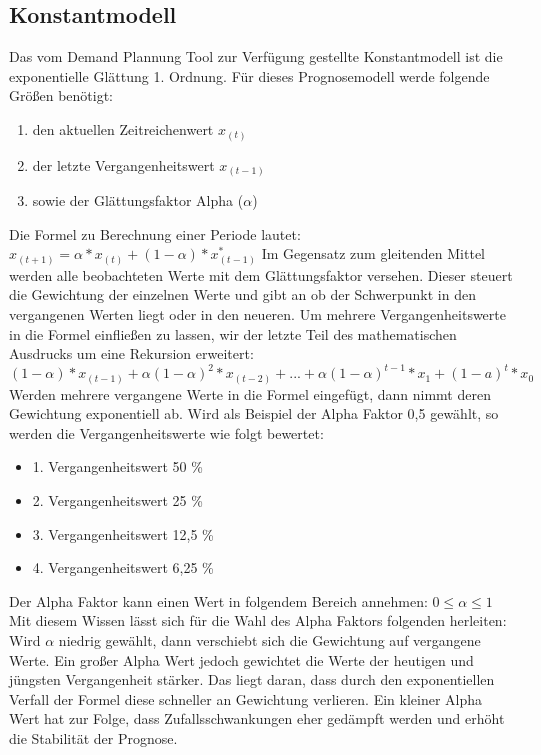 \subsection{Konstantmodell}
Das vom Demand Plannung Tool zur Verfügung gestellte Konstantmodell ist die exponentielle Glättung 1. Ordnung. Für dieses Prognosemodell werde folgende Größen benötigt:
\begin{enumerate}
	\item den aktuellen Zeitreichenwert \(x_{(t)}\)
	\item der letzte Vergangenheitswert \(x_{(t-1)}\)
	\item sowie der Glättungsfaktor Alpha (\(\alpha\))
\end{enumerate}
Die Formel zu Berechnung einer Periode lautet:
\newline
$x_{(t+1)} = \alpha * x_{(t)} + (1 - \alpha) * x^*_{(t-1)} $
\newline
Im Gegensatz zum gleitenden Mittel werden alle beobachteten Werte mit dem Glättungsfaktor versehen. Dieser steuert die Gewichtung der einzelnen Werte und gibt an ob der Schwerpunkt in den vergangenen Werten liegt oder in den neueren.
Um mehrere Vergangenheitswerte in die Formel einfließen zu lassen, wir der letzte Teil des mathematischen Ausdrucks um eine Rekursion erweitert:
\newline
$ (1 - \alpha) * x_{(t-1)} + \alpha(1 - \alpha)^{2} * x_{(t-2)} + ... + \alpha(1 - \alpha)^{t-1} * x_{1} + (1-a)^t * x_0 $
\newline
Werden mehrere vergangene Werte in die Formel eingefügt, dann nimmt deren Gewichtung exponentiell ab. Wird als Beispiel der Alpha Faktor 0,5 gewählt, so werden die Vergangenheitswerte wie folgt bewertet:
\begin{itemize}
	\item 1. Vergangenheitswert 50 \%
	\item 2. Vergangenheitswert 25 \%
	\item 3. Vergangenheitswert 12,5 \%
	\item 4. Vergangenheitswert 6,25 \%
\end{itemize}
Der Alpha Faktor kann einen Wert in folgendem Bereich annehmen:
$ 0 \leq \alpha \leq 1 $
Mit diesem Wissen lässt sich für die Wahl des Alpha Faktors folgenden herleiten:
Wird $\alpha$ niedrig gewählt, dann verschiebt sich die Gewichtung auf vergangene Werte. Ein großer Alpha Wert jedoch gewichtet die Werte der heutigen und jüngsten Vergangenheit stärker. Das liegt daran, dass durch den exponentiellen Verfall der Formel diese schneller an Gewichtung verlieren. Ein kleiner Alpha Wert hat zur Folge, dass Zufallsschwankungen eher gedämpft werden und erhöht die Stabilität der Prognose.

